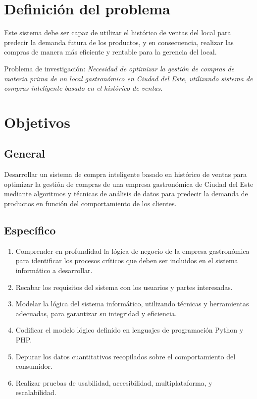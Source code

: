 \section{Definición del problema}
 Este sistema debe ser capaz de utilizar el histórico de ventas del local para predecir
la demanda futura de los productos, y en consecuencia, realizar las compras
de manera más eficiente y rentable para la gerencia del local.

Problema de investigación: \textit{Necesidad de optimizar la gestión de compras de materia prima de un local gastronómico en Ciudad del Este, utilizando sistema de compras inteligente basado en el histórico de ventas.}

\section{Objetivos}
\subsection{General}

Desarrollar un sistema de compra inteligente basado en histórico de ventas para optimizar la gestión de compras de una empresa gastronómica de Ciudad del Este mediante algoritmos y técnicas de análisis de datos para predecir la demanda de productos en función del comportamiento de los clientes.

\subsection{Específico}

\begin{enumerate}
\item  Comprender en profundidad la lógica de negocio de la empresa gastronómica para identificar los procesos críticos que deben ser incluidos en el sistema informático a desarrollar.
\item  Recabar los requisitos del sistema con los usuarios y partes interesadas.
\item  Modelar la lógica del sistema informático, utilizando técnicas y herramientas adecuadas, para garantizar su integridad y eficiencia.
\item  Codificar el modelo lógico definido en lenguajes de programación Python y PHP.
\item Depurar los datos cuantitativos recopilados sobre el comportamiento del consumidor.
\item  Realizar pruebas de usabilidad, accesibilidad, multiplataforma, y escalabilidad. 

\end{enumerate}
